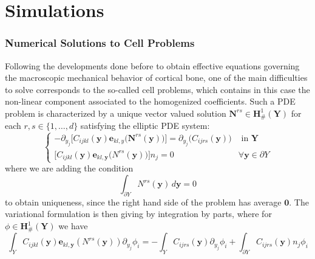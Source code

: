 \chapter{Simulations}

\subsection{Numerical Solutions to Cell Problems}
Following the developments done before to obtain effective equations governing the macroscopic mechanical behavior of cortical bone, one of the main difficulties to solve corresponds to the so-called cell problems, which contains in this case the non-linear component associated to the homogenized coefficients.
Such a PDE problem is characterized by a unique vector valued solution $\mathbf{N}^{rs} \in \mathbf{H}^1_{\#} (\mathbf{Y})$ for each $r,s \in \{1,\dots, d\}$ satisfying the elliptic PDE system:
\begin{equation*}
    \left \{
    \begin{array}{cc}
        - \partial_{y_j} \big[C_{ijkl}(\mathbf{y}) \mathbf{e}_{kl,y} \big( \mathbf{N}^{rs}(\mathbf{y}) \big)  \big] = \partial_{y_j} \big( C_{ijrs} (\mathbf{y}) \big)& \text{ in } \mathbf{Y} \\
        \big[ C_{ijkl}(\mathbf{y}) \mathbf{e}_{kl,\mathbf{y}}\big( N^{rs}(\mathbf{y}) \big) \big]n_j = 0 &  \forall \mathbf{y} \in \partial Y
    \end{array}
    \right.
\end{equation*}
where we are adding the condition 
\begin{equation*}
    \int_{\partial Y} N^{rs}(\mathbf{y}) \, d\mathbf{y} = 0
\end{equation*}
to obtain uniqueness, since the right hand side of the problem has average $\mathbf{0}$.
The variational formulation is then giving by integration by parts, where for $\phi \in \mathbf{H}^1_{\#}(\mathbf{Y})$ we have
\begin{equation*}
    \int_{Y} C_{ijkl}(\mathbf{y}) \mathbf{e}_{kl,\mathbf{y}}(N^{rs}(\mathbf{y})) \partial_{y_j}\phi_i = - \int_{Y}C_{ijrs}(\mathbf{y}) \partial_{y_j} \phi_i + \int_{\partial Y}C_{ijrs}(\mathbf{y}) n_j \phi_i
\end{equation*}

